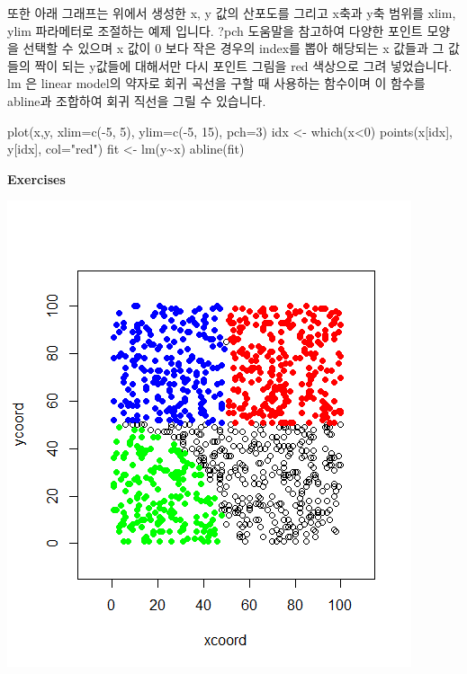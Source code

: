 \documentclass[
]{book}
\newenvironment{Shaded}{\begin{snugshade}}{\end{snugshade}}
\newcommand{\AttributeTok}[1]{\textcolor[rgb]{0.77,0.63,0.00}{#1}}
\newcommand{\DecValTok}[1]{\textcolor[rgb]{0.00,0.00,0.81}{#1}}
\newcommand{\FunctionTok}[1]{\textcolor[rgb]{0.00,0.00,0.00}{#1}}
\newcommand{\NormalTok}[1]{#1}
\newcommand{\OtherTok}[1]{\textcolor[rgb]{0.56,0.35,0.01}{#1}}
\newcommand{\SpecialCharTok}[1]{\textcolor[rgb]{0.00,0.00,0.00}{#1}}
\newcommand{\StringTok}[1]{\textcolor[rgb]{0.31,0.60,0.02}{#1}}
\begin{document}
또한 아래 그래프는 위에서 생성한 x, y 값의 산포도를 그리고 x축과 y축 범위를 xlim, ylim 파라메터로 조절하는 예제 입니다. ?pch 도움말을 참고하여 다양한 포인트 모양을 선택할 수 있으며 x 값이 0 보다 작은 경우의 index를 뽑아 해당되는 x 값들과 그 값들의 짝이 되는 y값들에 대해서만 다시 포인트 그림을 red 색상으로 그려 넣었습니다. lm 은 linear model의 약자로 회귀 곡선을 구할 때 사용하는 함수이며 이 함수를 abline과 조합하여 회귀 직선을 그릴 수 있습니다.

\begin{Shaded}
\begin{Highlighting}[]
\FunctionTok{plot}\NormalTok{(x,y, }\AttributeTok{xlim=}\FunctionTok{c}\NormalTok{(}\SpecialCharTok{{-}}\DecValTok{5}\NormalTok{, }\DecValTok{5}\NormalTok{), }\AttributeTok{ylim=}\FunctionTok{c}\NormalTok{(}\SpecialCharTok{{-}}\DecValTok{5}\NormalTok{, }\DecValTok{15}\NormalTok{), }\AttributeTok{pch=}\DecValTok{3}\NormalTok{)}
\NormalTok{idx }\OtherTok{\textless{}{-}} \FunctionTok{which}\NormalTok{(x}\SpecialCharTok{\textless{}}\DecValTok{0}\NormalTok{)}
\FunctionTok{points}\NormalTok{(x[idx], y[idx], }\AttributeTok{col=}\StringTok{"red"}\NormalTok{)}
\NormalTok{fit }\OtherTok{\textless{}{-}} \FunctionTok{lm}\NormalTok{(y}\SpecialCharTok{\textasciitilde{}}\NormalTok{x)}
\FunctionTok{abline}\NormalTok{(fit)}
\end{Highlighting}
\end{Shaded}

\textbf{Exercises}

\includegraphics{images/05/01.png}
\end{document}
